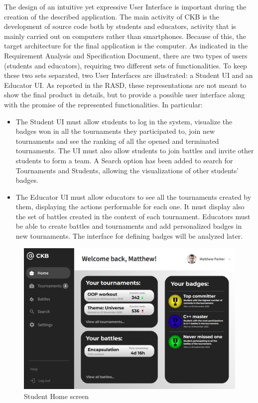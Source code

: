
The design of an intuitive yet expressive User Interface is important during the creation of the described application. The main activity of CKB is the development of source code both by students and educators, activity that is mainly carried out on computers rather than smartphones. Because of this, the target architecture for the final application is the computer. As indicated in the Requirement Analysis and Specification Document, there are two types of users (students and educators), requiring two different sets of functionalities. To keep these two sets separated, two User Interfaces are illustrated: a Student UI and an Educator UI. As reported in the RASD, these representations are not meant to show the final product in details, but to provide a possible user interface along with the promise of the represented functionalities.
In particular:
\begin{itemize}
    \item 
    The Student UI must allow students to log in the system, visualize the badges won in all the tournaments they participated to, join new tournaments and see the ranking of all the opened and terminated tournaments. The UI must also allow students to join battles and invite other students to form a team. A Search option has been added to search for Tournaments and Students, allowing the visualizations of other students' badges.
    \item
    The Educator UI must allow educators to see all the tournaments created by them, displaying the actions performable for each one. It must display also the set of battles created in the context of each tournament. Educators must be able to create battles and tournaments and add personalized badges in new tournaments. The interface for defining badges will be analyzed later.
\end{itemize}

\begin{figure}[H]
    \centering
    \includegraphics[width=0.8\linewidth]{Images/UI_Student_Home.png}
    \caption{Student Home screen}
    \label{fig:enter-label}
\end{figure}

